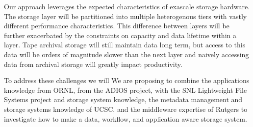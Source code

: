 Our approach leverages the expected characteristics of exascale storage
hardware. The storage layer will be partitioned into multiple heterogenous
tiers with vastly different performance characteristics. This difference
between layers will be further exacerbated by the constraints on capacity
and data lifetime within a layer. Tape archival storage will still maintain
data long term, but access to this data will be orders of magnitude slower
than the next layer and naively accessing data from archival storage will
greatly impact productivity.

To address these challenges we will We are proposing to combine the
applications knowledge from ORNL, from the ADIOS project, with the SNL
Lightweight File Systems project and storage system knowledge, the metadata
management and storage systems knowledge of UCSC, and the middleware expertise
of Rutgers to investigate how to make a data, workflow, and application aware
storage system.


